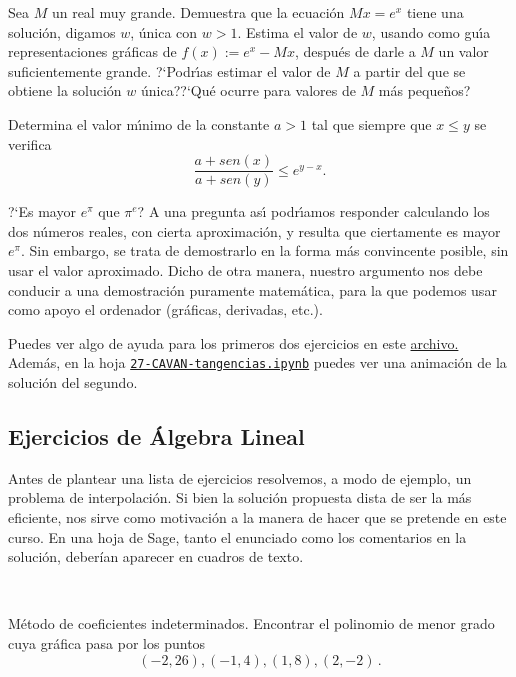 \begin{ejer}
	Sea $M$ un real muy grande. Demuestra que la ecuaci\'on $Mx=e^x$ tiene una soluci\'on, digamos $w$,  \'unica con $w>1$. Estima el valor de $w$, usando como gu\'{\i}a representaciones gr\'aficas de $f(x):=e^x-Mx$, despu\'es de darle a $M$ un valor suficientemente grande. ?`Podr\'{\i}as estimar el valor de $M$ a partir del que se obtiene la soluci\'on $w$ \'unica??`Qu\'e ocurre para valores de $M$ m\'as peque\~nos?
 \end{ejer}

\begin{ejer} Determina el valor m\'{\i}nimo de la constante $a>1$ tal que siempre que $x\le y$  se verifica 
	\[\frac{a+sen(x)}{a+sen(y)}\le e^{y-x}.\]
	
\end{ejer}
\begin{ejer}
	?`Es mayor $e^{\pi}$ que $\pi^{e}$? A una pregunta as\'{\i} podr\'{\i}amos responder calculando los dos n\'umeros reales, con cierta aproximaci\'on, y resulta que ciertamente es mayor $e^{\pi}$. Sin embargo, se trata de demostrarlo en la forma m\'as convincente posible,  sin usar el  valor aproximado. Dicho de otra manera, nuestro argumento nos debe conducir a una demostraci\'on puramente matem\'atica, para la que podemos usar como apoyo el ordenador (gr\'aficas, derivadas, etc.).
	
	\end{ejer}

Puedes ver algo de ayuda para los primeros dos  ejercicios en este
\href{http://150.244.21.37/PDFs/CAVAN/dos_ejercicios_calculo.pdf}{archivo.} Adem\'as, en la hoja
\href{http://localhost:8888/notebooks/CAVAN/27-CAVAN-tangencias.ipynb}{\tt 27-CAVAN-tangencias.ipynb}
puedes ver una animaci\'on de la soluci\'on del segundo.


\subsection{Ejercicios de Álgebra Lineal}\label{interp1}

Antes de plantear una lista de ejercicios  resolvemos, a modo de
ejemplo, un problema de interpolación. Si bien la solución propuesta dista de
ser la más eficiente,
nos sirve como motivación a la manera de hacer que se pretende en este curso. En
una hoja
de Sage, tanto el enunciado como los comentarios en la solución, deberían
aparecer en
cuadros de texto.

\

\begin{ejer}\label{coef-indet} {\upshape Método de coeficientes indeterminados}.
 Encontrar el polinomio de menor grado cuya gráfica pasa por los puntos
 $$
 (-2, 26), (-1, 4), (1, 8), (2, -2)\,.
 $$ 
\end{ejer}


